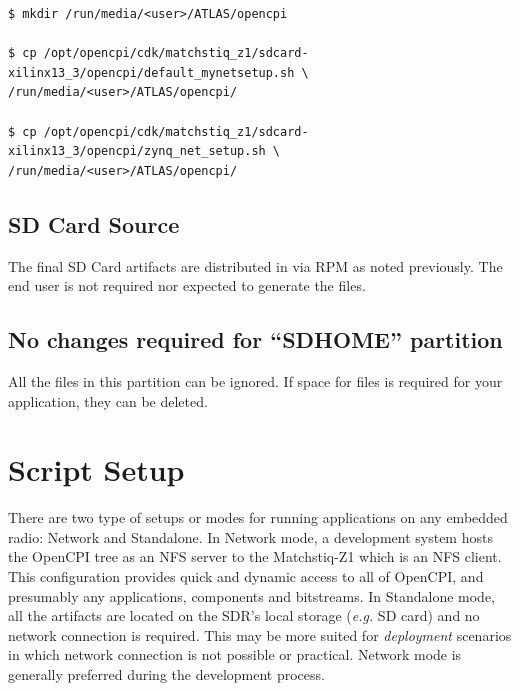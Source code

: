 \begin{verbatim}
$ mkdir /run/media/<user>/ATLAS/opencpi

$ cp /opt/opencpi/cdk/matchstiq_z1/sdcard-xilinx13_3/opencpi/default_mynetsetup.sh \
/run/media/<user>/ATLAS/opencpi/

$ cp /opt/opencpi/cdk/matchstiq_z1/sdcard-xilinx13_3/opencpi/zynq_net_setup.sh \
/run/media/<user>/ATLAS/opencpi/
\end{verbatim}

\subsection{SD Card Source}
The final SD Card artifacts are distributed in  via RPM as noted previously. The end user is not required nor expected to generate the files.

\subsection{No changes required for ``SDHOME'' partition}
All the files in this partition can be ignored. If space for files is required for your application, they can be deleted.


\pagebreak
\section{Script Setup}
There are two type of setups or modes for running applications on any embedded radio: Network and Standalone. In Network mode, a development system hosts the OpenCPI tree as an NFS server to the Matchstiq-Z1 which is an NFS client. This configuration provides quick and dynamic access to all of OpenCPI, and presumably any applications, components and bitstreams. In Standalone mode, all the artifacts are located on the SDR's local storage (\textit{e.g.} SD card) and no network connection is required. This may be more suited for \textit{deployment} scenarios in which network connection is not possible or practical. Network mode is generally preferred during the development process.

